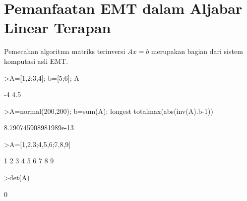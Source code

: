 \documentclass[a4paper,11pt,oneside,enabledeprecatedfontcommands]{scrbook}
\newenvironment{eulernotebook}{}{}
\newcommand{\eulerheading}[1]{\chapter{#1}}
\newenvironment{eulercomment}{\par\medskip\noindent}{\par\medskip}
\begin{document}
\begin{eulernotebook}
\eulerheading{Pemanfaatan EMT dalam Aljabar Linear Terapan}
\begin{eulercomment}
Pemecahan algoritma matriks terinversi $Ax=b$ merupakan bagian dari sistem komputasi asli EMT.
\end{eulercomment}
\begin{eulerprompt}
>A=[1,2;3,4]; b=[5;6]; A\b
\end{eulerprompt}
\begin{euleroutput}
           -4 
          4.5 
\end{euleroutput}
\begin{eulerprompt}
>A=normal(200,200); b=sum(A); longest totalmax(abs(inv(A).b-1))
\end{eulerprompt}
\begin{euleroutput}
  8.790745908981989e-13 
\end{euleroutput}
\begin{eulerprompt}
>A=[1,2,3;4,5,6;7,8,9]
\end{eulerprompt}
\begin{euleroutput}
            1             2             3 
            4             5             6 
            7             8             9 
\end{euleroutput}
\begin{eulerprompt}
>det(A)
\end{eulerprompt}
\begin{euleroutput}
0
\end{euleroutput}


\end{eulernotebook}
\end{document}
